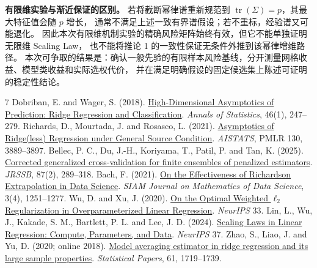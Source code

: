 \documentclass[UTF8,fontset=fandol,11pt,a4paper]{ctexart}
\begin{document}
\textbf{有限维实验与渐近保证的区别。}
若将截断幂律谱重新规范到 $\operatorname{tr}(\Sigma)=p$，其最大特征值会随 $p$ 增长，
通常不满足上述一致有界谱假设；若不重标，经验谱又可能退化。
因此本次有限维机制实验的精确风险矩阵始终有效，但它不能单独证明无限维 Scaling Law，
也不能将推论 1 的一致性保证无条件外推到该幂律增维路径。
本次可争取的结果是：确认一般先验的有限样本风险基线，分开测量网格收益、模型类收益和实际选权代价，
并在满足明确假设的固定候选集上陈述可证明的稳定性结论。

\clearpage
\begin{thebibliography}{7}\small
{} Dobriban, E. and Wager, S. (2018). \href{https://arxiv.org/abs/1507.03003}{High-Dimensional Asymptotics of Prediction: Ridge Regression and Classification}. \emph{Annals of Statistics}, 46(1), 247--279.
 Richards, D., Mourtada, J. and Rosasco, L. (2021). \href{https://proceedings.mlr.press/v130/richards21b.html}{Asymptotics of Ridge(less) Regression under General Source Condition}. \emph{AISTATS}, PMLR 130, 3889--3897.
 Bellec, P. C., Du, J.-H., Koriyama, T., Patil, P. and Tan, K. (2025). \href{https://arxiv.org/html/2310.01374v2}{Corrected generalized cross-validation for finite ensembles of penalized estimators}. \emph{JRSSB}, 87(2), 289--318.
 Bach, F. (2021). \href{https://www.di.ens.fr/~fbach/Richardson_SIAM_2021.pdf}{On the Effectiveness of Richardson Extrapolation in Data Science}. \emph{SIAM Journal on Mathematics of Data Science}, 3(4), 1251--1277.
 Wu, D. and Xu, J. (2020). \href{https://proceedings.neurips.cc/paper/2020/hash/72e6d3238361fe70f22fb0ac624a7072-Abstract.html}{On the Optimal Weighted $\ell_2$ Regularization in Overparameterized Linear Regression}. \emph{NeurIPS} 33.
 Lin, L., Wu, J., Kakade, S. M., Bartlett, P. L. and Lee, J. D. (2024). \href{https://proceedings.neurips.cc/paper_files/paper/2024/hash/6fcb1afcc1e9c2c82c8ddddf03bcf0f6-Abstract.html}{Scaling Laws in Linear Regression: Compute, Parameters, and Data}. \emph{NeurIPS} 37.
 Zhao, S., Liao, J. and Yu, D. (2020; online 2018). \href{https://link.springer.com/article/10.1007/s00362-018-1002-4}{Model averaging estimator in ridge regression and its large sample properties}. \emph{Statistical Papers}, 61, 1719--1739.
\end{thebibliography}
\end{document}
